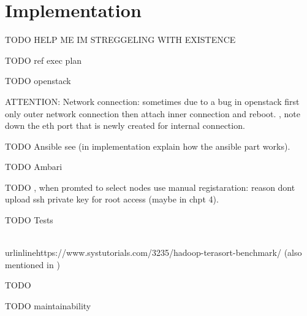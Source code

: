 \chapter{Implementation}
\label{chap:impl}

TODO HELP ME IM STREGGELING WITH EXISTENCE



TODO ref exec plan

TODO openstack

    ATTENTION: Network connection: sometimes due to a bug in openstack first only outer network connection then attach inner connection and reboot. 
    , note down the eth port that is newly created for internal connection.

TODO Ansible
see 
     (in implementation explain how the ansible part works). 

TODO Ambari

    TODO ,  when promted to select nodes use manual registaration: reason dont upload ssh private key for root access (maybe in chpt 4).

TODO Tests



\\urlinline{https://www.systutorials.com/3235/hadoop-terasort-benchmark/} (also mentioned in \autocite[][]{white2015hadoop})


TODO

TODO maintainability
